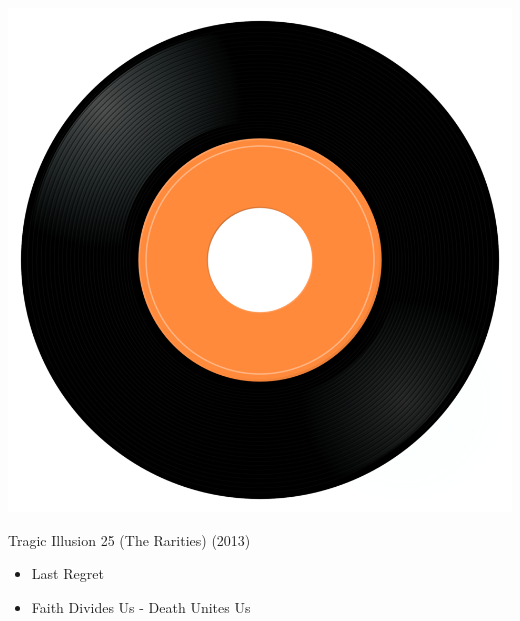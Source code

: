 \begin{minipage}[t]{0.25\textwidth}
\captionsetup{type=figure}
\includegraphics[width=\textwidth]{Images/cover.png}
\caption*{Tragic Illusion 25 (The Rarities) (2013)}
\end{minipage}
\begin{minipage}[t]{0.25\textwidth}\vspace{0pt}
\begin{itemize}[nosep,leftmargin=1em,labelwidth=*,align=left]
	\setlength{\itemsep}{0pt}
	\item Last Regret
	\item Faith Divides Us - Death Unites Us
\end{itemize}
\end{minipage}
